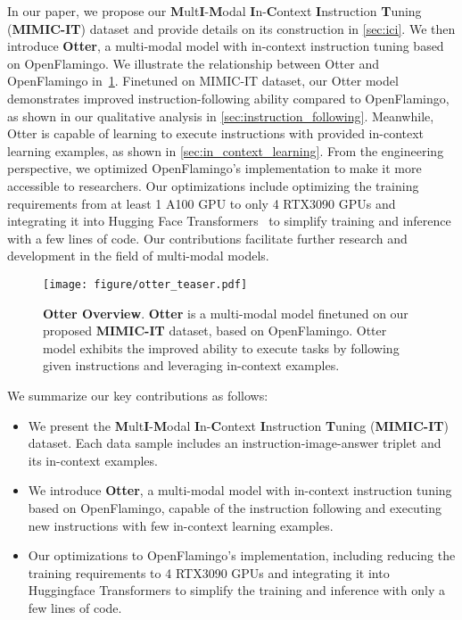 \documentclass{article}
\begin{document}
In our paper, we propose our \textbf{M}ult\textbf{I}-\textbf{M}odal \textbf{I}n-\textbf{C}ontext \textbf{I}nstruction \textbf{T}uning (\textbf{MIMIC-IT}) dataset and provide details on its construction in \cref{sec:ici}. We then introduce \textbf{Otter}, a multi-modal model with in-context instruction tuning based on OpenFlamingo. We illustrate the relationship between Otter and OpenFlamingo in~\cref{fig:otter_teaser}. Finetuned on MIMIC-IT dataset, our Otter model demonstrates improved instruction-following ability compared to OpenFlamingo, as shown in our qualitative analysis in \cref{sec:instruction_following}. Meanwhile, Otter is capable of learning to execute instructions with provided in-context learning examples, as shown in \cref{sec:in_context_learning}. From the engineering perspective, we optimized OpenFlamingo's implementation to make it more accessible to researchers. Our optimizations include optimizing the training requirements from at least 1 A100 GPU to only 4 RTX3090 GPUs and integrating it into Hugging Face Transformers~\cite{transformers} to simplify training and inference with a few lines of code. Our contributions facilitate further research and development in the field of multi-modal models.

\begin{figure}[tp]
    \centering
    \texttt{[image: figure/otter\_teaser.pdf]}
    \caption{\textbf{Otter Overview}. \textbf{Otter} is a multi-modal model finetuned on our proposed \textbf{MIMIC-IT} dataset, based on OpenFlamingo. Otter model exhibits the improved ability to execute tasks by following given instructions and leveraging in-context examples.}
    \label{fig:otter_teaser}
\end{figure}

We summarize our key contributions as follows:

\begin{itemize}
    \item We present the \textbf{M}ult\textbf{I}-\textbf{M}odal \textbf{I}n-\textbf{C}ontext \textbf{I}nstruction \textbf{T}uning (\textbf{MIMIC-IT}) dataset. Each data sample includes an instruction-image-answer triplet and its in-context examples.
    \item We introduce \textbf{Otter}, a multi-modal model with in-context instruction tuning based on OpenFlamingo, capable of the instruction following and executing new instructions with few in-context learning examples.
    \item Our optimizations to OpenFlamingo's implementation, including reducing the training requirements to 4 RTX3090 GPUs and integrating it into Huggingface Transformers to simplify the training and inference with only a few lines of code.
\end{itemize}
\end{document}
